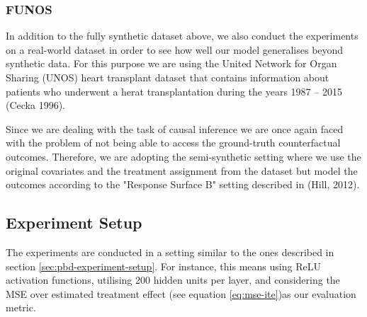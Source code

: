 
\subsubsection{FUNOS}
In addition to the fully synthetic dataset above, we also conduct the experiments on a real-world dataset in order to see how well our model generalises beyond synthetic data. For this purpose we are using the United Network for Organ Sharing (UNOS) heart transplant dataset  
that contains information about patients who underwent a herat transplantation during the years 1987 -- 2015 (Cecka 1996).%

Since we are dealing with the task of causal inference we are once again faced with the problem of not being able to access the ground-truth counterfactual outcomes. Therefore, we are adopting the semi-synthetic setting where we use the original covariates and the treatment assignment from the dataset but model the outcomes according to the "Response Surface B" setting described in (Hill, 2012). %



\subsection{Experiment Setup}
The experiments are conducted in a setting similar to the ones described in section \ref{sec:pbd-experiment-setup}. For instance, this means using ReLU activation functions, utilising 200 hidden units per layer, and considering the MSE over estimated treatment effect (see equation \ref{eq:mse-ite})as our evaluation metric. 

